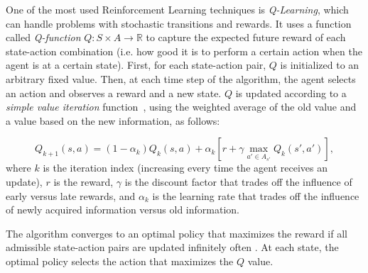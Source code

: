 One of the most used Reinforcement Learning techniques is \emph{Q-Learning}, which can handle problems with stochastic transitions and rewards. It uses a function called \emph{Q-function} $Q: S \times A \to \mathbb{R}$ to capture the expected future reward of each state-action combination (i.e. how good it is to perform a certain action when the agent is at a certain state). First, for each state-action pair, $Q$ is initialized to an arbitrary fixed value. Then, at each time step of the algorithm, the agent selects an action and observes a reward and a new state. $Q$ is updated according to a \emph{simple value iteration} function~\cite{mitchell1997machine}, using the weighted average of the old value and a value based on  the new information, as follows:


\begin{equation}
  Q_{k+1}(s, a) = (1 - \alpha_k) Q_k(s, a) + \alpha_k \left[ r + \gamma \max_{a' \in A_{s'}} Q_k(s', a') \right],
\end{equation}
where $k$ is the iteration index (increasing every time the agent receives an update), $r$ is the reward, 
$\gamma$ is the discount factor that trades off the influence of early versus late rewards, and $\alpha_k$ is the learning rate that trades off the influence of newly acquired information versus old information.

The algorithm converges to an optimal policy that maximizes the reward if all admissible state-action pairs are updated infinitely often %
\cite{sutton1998,barto2003}. At each state, the optimal policy selects  the action that maximizes the $Q$ value.


